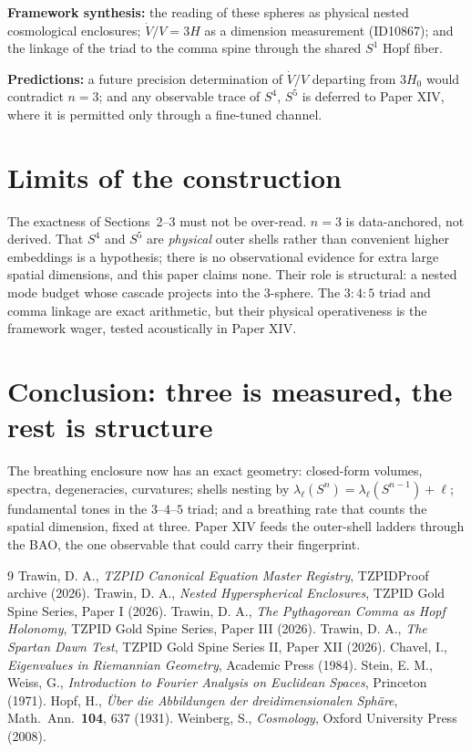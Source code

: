 \documentclass[11pt]{article}
\theoremstyle{remark}
\begin{document}
\textbf{Framework synthesis:} the reading of these spheres as physical nested cosmological enclosures; $\dot V/V = 3H$ as a dimension measurement (ID10867); and the linkage of the triad to the comma spine through the shared $S^1$ Hopf fiber.

\textbf{Predictions:} a future precision determination of $\dot V/V$ departing from $3H_0$ would contradict $n = 3$; and any observable trace of $S^4$, $S^5$ is deferred to Paper XIV, where it is permitted only through a fine-tuned channel.
\section{Limits of the construction}
The exactness of Sections~2--3 must not be over-read. $n = 3$ is data-anchored, not derived. That $S^4$ and $S^5$ are \emph{physical} outer shells rather than convenient higher embeddings is a hypothesis; there is no observational evidence for extra large spatial dimensions, and this paper claims none. Their role is structural: a nested mode budget whose cascade projects into the $3$-sphere. The $3{:}4{:}5$ triad and comma linkage are exact arithmetic, but their physical operativeness is the framework wager, tested acoustically in Paper XIV.
\section{Conclusion: three is measured, the rest is structure}
The breathing enclosure now has an exact geometry: closed-form volumes, spectra, degeneracies, curvatures; shells nesting by $\lambda_\ell(S^n) = \lambda_\ell(S^{n-1}) + \ell$; fundamental tones in the $3$--$4$--$5$ triad; and a breathing rate that counts the spatial dimension, fixed at three. Paper XIV feeds the outer-shell ladders through the BAO, the one observable that could carry their fingerprint.
\begin{thebibliography}{9}
 Trawin, D. A., \emph{TZPID Canonical Equation Master Registry}, TZPIDProof archive (2026).
 Trawin, D. A., \emph{Nested Hyperspherical Enclosures}, TZPID Gold Spine Series, Paper I (2026).
 Trawin, D. A., \emph{The Pythagorean Comma as Hopf Holonomy}, TZPID Gold Spine Series, Paper III (2026).
 Trawin, D. A., \emph{The Spartan Dawn Test}, TZPID Gold Spine Series II, Paper XII (2026).
 Chavel, I., \emph{Eigenvalues in Riemannian Geometry}, Academic Press (1984).
 Stein, E. M., Weiss, G., \emph{Introduction to Fourier Analysis on Euclidean Spaces}, Princeton (1971).
 Hopf, H., \emph{\"Uber die Abbildungen der dreidimensionalen Sph\"are}, Math.\ Ann.\ \textbf{104}, 637 (1931).
 Weinberg, S., \emph{Cosmology}, Oxford University Press (2008).
\end{thebibliography}
\end{document}
